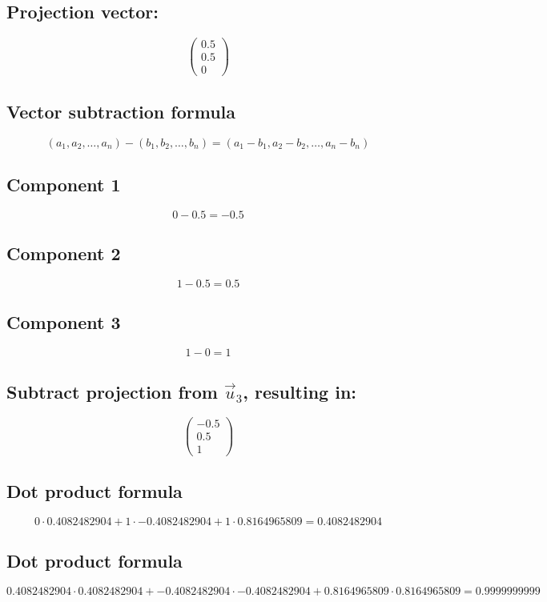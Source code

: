 \documentclass{article}
\begin{document}
\subsection*{ \vspace{1em} Projection vector:}
\[
\begin{pmatrix}0.5 \\ 0.5 \\ 0\end{pmatrix}
\]
\subsection*{ \vspace{1em} Vector subtraction formula}
\[
(a_1, a_2, \dots, a_n) - (b_1, b_2, \dots, b_n) = (a_1 - b_1, a_2 - b_2, \dots, a_n - b_n)
\]
\subsection*{ \vspace{1em} Component 1}
\[
0 - 0.5 = -0.5
\]
\subsection*{ \vspace{1em} Component 2}
\[
1 - 0.5 = 0.5
\]
\subsection*{ \vspace{1em} Component 3}
\[
1 - 0 = 1
\]
\subsection*{ \vspace{1em} Subtract projection from \(\vec{u}_{3}\), resulting in:}
\[
\begin{pmatrix}-0.5 \\ 0.5 \\ 1\end{pmatrix}
\]
\subsection*{ \vspace{1em} Dot product formula}
\[
0 \cdot 0.4082482904 + 1 \cdot -0.4082482904 + 1 \cdot 0.8164965809 = 0.4082482904
\]
\subsection*{ \vspace{1em} Dot product formula}
\[
0.4082482904 \cdot 0.4082482904 + -0.4082482904 \cdot -0.4082482904 + 0.8164965809 \cdot 0.8164965809 = 0.9999999999
\]
\end{document}

